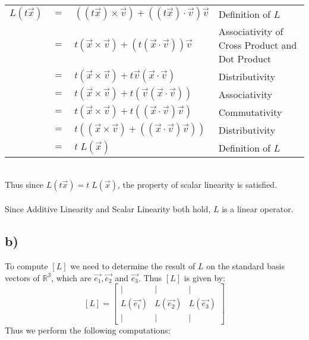 \documentclass{article}
\begin{document}
\begin{table}[htp]
    \centering
    \begin{tabular}{ccll}
        $L(t\vec{x})$ & $=$ & $((t\vec{x})\times\vec{v})+((t\vec{x})\cdot\vec{v})\vec{v}$ & Definition of $L$\\
         & $=$ & $t(\vec{x}\times\vec{v})+(t(\vec{x}\cdot\vec{v}))\vec{v}$ & Associativity of Cross Product and Dot Product\\
         & $=$ & $t(\vec{x}\times\vec{v})+t\vec{v}(\vec{x}\cdot\vec{v})$  & Distributivity\\
         & $=$ & $t(\vec{x}\times\vec{v})+t(\vec{v}(\vec{x}\cdot\vec{v}))$ & Associativity\\
         & $=$ & $t(\vec{x}\times\vec{v})+t((\vec{x}\cdot\vec{v})\vec{v})$ & Commutativity\\
         & $=$ & $t((\vec{x}\times\vec{v})+((\vec{x}\cdot\vec{v})\vec{v}))$& Distributivity \\
         & $=$ & $t\;L(\vec{x})$ & Definition of $L$
    \end{tabular}
\end{table} \\
Thus since $L(t\vec{x})=t\;L(\vec{x})$, the property of scalar linearity is satisfied. \\ \\Since Additive Linearity and Scalar Linearity both hold, $L$ is a linear operator.
\newpage
\subsection*{b)}
To compute $[L]$ we need to determine the result of $L$ on the standard basis vectors of $\mathbb{R}^3$, which are $\vec{e_1},\vec{e_2}$ and $\vec{e_3}$. Thus $[L]$ is given by: $$[L]=\begin{bmatrix}
    | & | & | \\
    L(\vec{e_1}) & L(\vec{e_2}) & L(\vec{e_3})\\
    | & | & |
\end{bmatrix}$$ Thus we perform the following computations:\\
\end{document}
